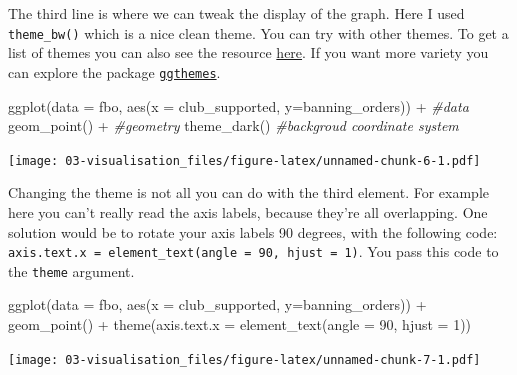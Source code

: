 \documentclass[
]{book}
\newenvironment{Shaded}{\begin{snugshade}}{\end{snugshade}}
\newcommand{\AttributeTok}[1]{\textcolor[rgb]{0.77,0.63,0.00}{#1}}
\newcommand{\CommentTok}[1]{\textcolor[rgb]{0.56,0.35,0.01}{\textit{#1}}}
\newcommand{\DecValTok}[1]{\textcolor[rgb]{0.00,0.00,0.81}{#1}}
\newcommand{\FunctionTok}[1]{\textcolor[rgb]{0.00,0.00,0.00}{#1}}
\newcommand{\NormalTok}[1]{#1}
\newcommand{\SpecialCharTok}[1]{\textcolor[rgb]{0.00,0.00,0.00}{#1}}
\begin{document}
The third line is where we can tweak the display of the graph. Here I used \texttt{theme\_bw()} which is a nice clean theme. You can try with other themes. To get a list of themes you can also see the resource \href{http://docs.ggplot2.org/current/}{here}. If you want more variety you can explore the package \href{https://yutannihilation.github.io/allYourFigureAreBelongToUs/ggthemes/}{\texttt{ggthemes}}.

\begin{Shaded}
\begin{Highlighting}[]
\FunctionTok{ggplot}\NormalTok{(}\AttributeTok{data =}\NormalTok{ fbo, }\FunctionTok{aes}\NormalTok{(}\AttributeTok{x =}\NormalTok{ club\_supported, }\AttributeTok{y=}\NormalTok{banning\_orders)) }\SpecialCharTok{+}     \CommentTok{\#data}
   \FunctionTok{geom\_point}\NormalTok{() }\SpecialCharTok{+}                                                   \CommentTok{\#geometry}
  \FunctionTok{theme\_dark}\NormalTok{()                                                      }\CommentTok{\#backgroud coordinate system}
\end{Highlighting}
\end{Shaded}

\texttt{[image: 03-visualisation\_files/figure-latex/unnamed-chunk-6-1.pdf]}

Changing the theme is not all you can do with the third element. For example here you can't really read the axis labels, because they're all overlapping. One solution would be to rotate your axis labels 90 degrees, with the following code: \texttt{axis.text.x\ =\ element\_text(angle\ =\ 90,\ hjust\ =\ 1)}. You pass this code to the \texttt{theme} argument.

\begin{Shaded}
\begin{Highlighting}[]
\FunctionTok{ggplot}\NormalTok{(}\AttributeTok{data =}\NormalTok{ fbo, }\FunctionTok{aes}\NormalTok{(}\AttributeTok{x =}\NormalTok{ club\_supported, }\AttributeTok{y=}\NormalTok{banning\_orders)) }\SpecialCharTok{+}     
   \FunctionTok{geom\_point}\NormalTok{() }\SpecialCharTok{+}                                                   
  \FunctionTok{theme}\NormalTok{(}\AttributeTok{axis.text.x =} \FunctionTok{element\_text}\NormalTok{(}\AttributeTok{angle =} \DecValTok{90}\NormalTok{, }\AttributeTok{hjust =} \DecValTok{1}\NormalTok{))                                   }
\end{Highlighting}
\end{Shaded}

\texttt{[image: 03-visualisation\_files/figure-latex/unnamed-chunk-7-1.pdf]}
\end{document}
